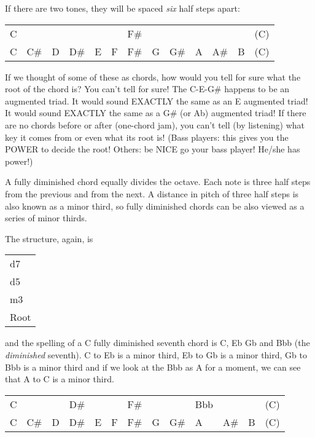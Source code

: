 If there are two tones, they will be spaced \emph{six} half steps apart:

\begin{center}
\begin{tabular}{ l l l l l l l l l l l l l }
  C &     &   &     &   &   & F\# &   &     &   &     &   & (C)\\
  C & C\# & D & D\# & E & F & F\# & G & G\# & A & A\# & B & (C)\\
\end{tabular}
\end{center}

If we thought of some of these as chords, how would you tell for sure what the
root of the chord is? You can't tell for sure! The C-E-G\# happens to be an
augmented triad. It would sound EXACTLY the same as an E augmented triad! It
would sound EXACTLY the same as a G\# (or Ab) augmented triad! If there are no
chords before or after (one-chord jam), you can't tell (by listening) what key
it comes from or even what its root is! (Bass players: this gives you the POWER
to decide the root! Others: be NICE go your bass player! He/she has power!)

A fully diminished chord equally divides the octave. Each note is three half
steps from the previous and from the next. A distance in pitch of three half
steps is also known as a minor third, so fully diminished chords can be also
viewed as a series of minor thirds.

The structure, again, is

\begin{center}
\begin{tabular}{ | l | }
  \hline
  d7\\
  d5\\
  m3\\
  Root\\
  \hline
\end{tabular}
\end{center}

and the spelling of a C fully diminished seventh chord is C, Eb Gb and Bbb
(the \emph{diminished} seventh). C to Eb is a minor third, Eb to Gb is a minor
third, Gb to Bbb is a minor third and if we look at the Bbb as A for a moment,
we can see that A to C is a minor third.

\begin{center}
\begin{tabular}{ l l l l l l l l l l l l l }
  C &     &   & D\# &   &   & F\# &   &     & Bbb &     &   & (C)\\
  C & C\# & D & D\# & E & F & F\# & G & G\# & A   & A\# & B & (C)\\
\end{tabular}
\end{center}

